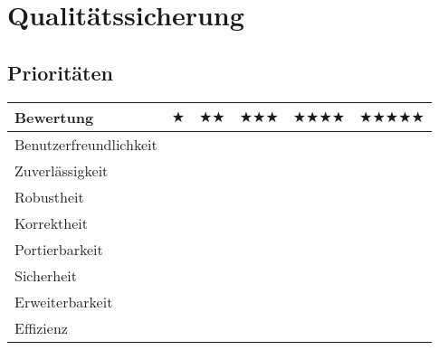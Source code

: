 %
%


\chapter{Qualitätssicherung}
\label{Qualitätssicherung}


%
%
\section{Prioritäten}

\begin{center}
	
	
	\setlength{\LTleft}{-20cm plus -1fill}
	\setlength{\LTright}{\LTleft}
	
	\begin{longtable}{|l|c|c|c|c|c|}
	
	
		\hline 
		
		Bewertung & $\bigstar$ & 
		$\bigstar\bigstar$ & 
		$\bigstar\bigstar\bigstar$ & 
		$\bigstar\bigstar\bigstar\bigstar$ &
		$\bigstar\bigstar\bigstar\bigstar\bigstar$ \\
		
		\hline
		\hline
		
		Benutzerfreundlichkeit &  &  &  &  &  \\
		
		\hline
		
		Zuverlässigkeit &  &  &  &  &  \\
				
		\hline

		Robustheit &  &  &  &  &  \\
		
		\hline

		Korrektheit &  &  &  &  &  \\
		
		\hline

		Portierbarkeit &  &  &  &  &  \\
		
		\hline

		Sicherheit &  &  &  &  &  \\
		
		\hline

		Erweiterbarkeit &  &  &  &  &  \\
		
		\hline

		Effizienz &  &  &  &  &  \\
		

\end{longtable}
\end{center}

